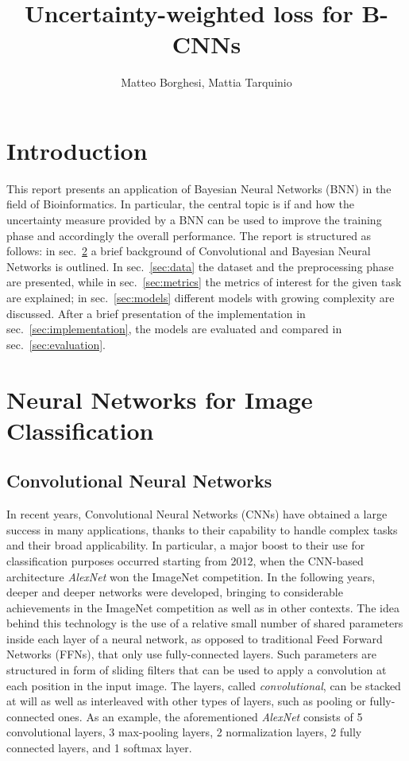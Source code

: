 \documentclass[11pt,twoside,a4paper]{article}
\begin{document}
\title{Uncertainty-weighted loss for B-CNNs}
\author{Matteo Borghesi, Mattia Tarquinio}
\maketitle

\section{Introduction}
This report presents an application of Bayesian Neural Networks (BNN) in the field of Bioinformatics. In particular, the central topic is if and how the uncertainty measure provided by a BNN can be used to improve the training phase and accordingly the overall performance.\newline
The report is structured as follows: in sec.~\ref{sec:NN} a brief background of Convolutional and Bayesian Neural Networks is outlined. In sec.~\ref{sec:data} the dataset and the preprocessing phase are presented, while in sec.~\ref{sec:metrics} the metrics of interest for the given task are explained; in sec.~\ref{sec:models} different models with growing complexity are discussed.  After a brief presentation of the implementation in sec.~\ref{sec:implementation}, the models are evaluated and compared in sec.~\ref{sec:evaluation}.

\section{Neural Networks for Image Classification}
\label{sec:NN}
\subsection{Convolutional Neural Networks}
In recent years, Convolutional Neural Networks (CNNs) have obtained a large success in many applications, thanks to their capability to handle complex tasks and their broad applicability. In particular, a major boost to their use for classification purposes occurred starting from 2012, when the CNN-based architecture \textit{AlexNet} won the ImageNet competition. In the following years, deeper and deeper networks were developed, bringing to considerable achievements in the ImageNet competition as well as in other contexts.\newline
The idea behind this technology is the use of a relative small number of shared parameters inside each layer of a neural network, as opposed to traditional Feed Forward Networks (FFNs), that only use fully-connected layers. Such parameters are structured in form of sliding filters that can be used to apply a convolution at each position in the input image. The layers, called \textit{convolutional}, can be stacked at will as well as interleaved with other types of layers, such as pooling or fully-connected ones. As an example, the aforementioned \textit{AlexNet} consists of 5 convolutional layers, 3 max-pooling layers, 2 normalization layers, 2 fully connected layers, and 1 softmax layer.
\end{document}
